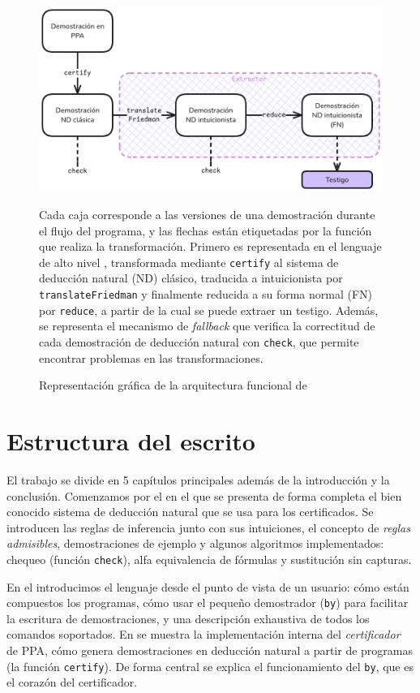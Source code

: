 \begin{figure}[h]
    \includegraphics[scale=0.42]{img/arch.png}
    \centering
    \caption{Representación gráfica de la arquitectura funcional de \ppaTool{}}
    \medskip
    \small
    Cada caja corresponde a las versiones de una demostración durante el flujo del programa, y las flechas están etiquetadas por la función que realiza la transformación. Primero es representada en el lenguaje de alto nivel \ppaLang{}, transformada mediante \texttt{certify} al sistema de deducción natural (ND) clásico, traducida a intuicionista por \texttt{translateFriedman} y finalmente reducida a su forma normal (FN) por \texttt{reduce}, a partir de la cual se puede extraer un testigo.
    Además, se representa el mecanismo de \textit{fallback} que verifica la correctitud de cada demostración de deducción natural con \texttt{check}, que permite encontrar problemas en las transformaciones.
    \label{intro:fig:ppa-arch}
\end{figure}

\section{Estructura del escrito}

El trabajo se divide en 5 capítulos principales además de la introducción y la conclusión. Comenzamos por el  en el que se presenta de forma completa el bien conocido sistema de deducción natural que se usa para los certificados. Se introducen las reglas de inferencia junto con sus intuiciones, el concepto de \textit{reglas admisibles}, demostraciones de ejemplo y algunos algoritmos implementados: chequeo (función \texttt{check}), alfa equivalencia de fórmulas y sustitución sin capturas.

En el  introducimos el lenguaje desde el punto de vista de un usuario: cómo están compuestos los programas, cómo usar el pequeño demostrador (\lstinline{by}) para facilitar la escritura de demostraciones, y una descripción exhaustiva de todos los comandos soportados. En  se muestra la implementación interna del \textit{certificador} de PPA, cómo genera demostraciones en deducción natural a partir de programas (la función \texttt{certify}). De forma central se explica el funcionamiento del \lstinline{by}, que es el corazón del certificador.


